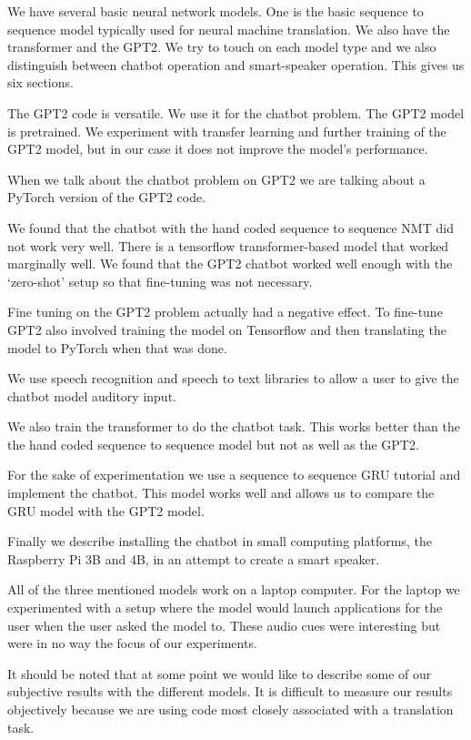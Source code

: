 We have several basic neural network models. One is the basic sequence to sequence model typically used for neural machine translation. We also have the transformer and the GPT2. We try to touch on each model type and we also distinguish between chatbot operation and smart-speaker operation. This gives us six sections.

The GPT2 code is versatile. We use it for the chatbot problem. The GPT2 model is pretrained. We experiment with transfer learning and further training of the GPT2 model, but in our case it does not improve the model's performance. 

When we talk about the chatbot problem on GPT2 we are talking about a PyTorch version of the GPT2 code. 

We found that the chatbot with the hand coded sequence to sequence NMT did not work very well. There is a tensorflow transformer-based model that worked marginally well. We found that the GPT2 chatbot worked well enough with the `zero-shot' setup so that fine-tuning was not necessary. 

Fine tuning on the GPT2 problem actually had a negative effect. To fine-tune GPT2 also involved training the model on Tensorflow and then translating the model to PyTorch when that was done. 

We use speech recognition and speech to text libraries to allow a user to give the chatbot model auditory input.

We also train the transformer to do the chatbot task. This works better than the the hand coded sequence to sequence model but not as well as the GPT2. 

For the sake of experimentation we use a sequence to sequence GRU tutorial and implement the chatbot. This model works well and allows us to compare the GRU model with the GPT2 model.

Finally we describe installing the chatbot in small computing platforms, the Raspberry Pi 3B and 4B, in an attempt to create a smart speaker.

All of the three mentioned models work on a laptop computer. For the laptop we experimented with a setup where the model would launch applications for the user when the user asked the model to. These audio cues were interesting but were in no way the focus of our experiments.

It should be noted that at some point we would like to describe some of our subjective results with the different models. It is difficult to measure our results objectively because we are using code most closely associated with a translation task. 

